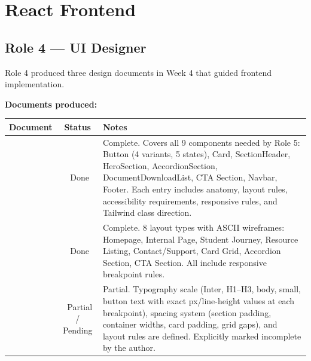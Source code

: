 \documentclass[12pt,a4paper]{article}
\newcommand{\done}{\textcolor{statusGreen}{\faCheckCircle\ Done}}
\newcommand{\warn}{\textcolor{statusAmber}{\faExclamationTriangle\ Partial / Pending}}
\begin{document}
\nopagecolor
\color{textGray}

\tableofcontents
\newpage

\section{React Frontend}

\subsection{Role 4 --- UI Designer}

Role 4 produced three design documents in Week 4 that guided frontend implementation.

\vspace{0.6em}
\noindent\textbf{Documents produced:}
\vspace{0.4em}

\begin{longtable}{@{}L{3.8cm}cL{8.5cm}@{}}
\toprule
{}
\textbf{Document} & \textbf{Status} & \textbf{Notes} \\
\midrule
\endhead
{}
    & \done
    & Complete. Covers all 9 components needed by Role 5: Button (4 variants,
      5 states), Card, SectionHeader, HeroSection, AccordionSection,
      DocumentDownloadList, CTA Section, Navbar, Footer. Each entry includes
      anatomy, layout rules, accessibility requirements, responsive rules,
      and Tailwind class direction. \\
\addlinespace
{}
    & \done
    & Complete. 8 layout types with ASCII wireframes: Homepage, Internal Page,
      Student Journey, Resource Listing, Contact/Support, Card Grid, Accordion
      Section, CTA Section. All include responsive breakpoint rules. \\
\addlinespace
{}
    & \warn
    & Partial. Typography scale (Inter, H1--H3, body, small, button text with
      exact px/line-height values at each breakpoint), spacing system (section
      padding, container widths, card padding, grid gaps), and layout rules are
      defined. Explicitly marked incomplete by the author. \\
\bottomrule
\end{longtable}
\end{document}
